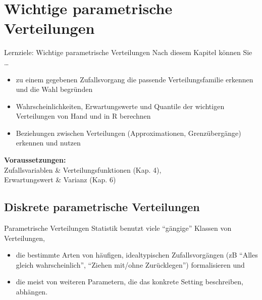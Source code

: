 \documentclass[
  10pt,
  ignorenonframetext,
]{beamer}
\providecommand{\tightlist}{%
  \setlength{\itemsep}{0pt}\setlength{\parskip}{0pt}}
\begin{document}
\hypertarget{wichtige-parametrische-verteilungen}{%
\section{Wichtige parametrische
Verteilungen}\label{wichtige-parametrische-verteilungen}}

\begin{frame}{Lernziele: Wichtige parametrische Verteilungen}
\protect\hypertarget{lernziele-wichtige-parametrische-verteilungen}{}
Nach diesem Kapitel können Sie \ldots{}

\begin{itemize}
\tightlist
\item
  zu einem gegebenen Zufallsvorgang die passende Verteilungsfamilie
  erkennen und die Wahl begründen
\item
  Wahrscheinlichkeiten, Erwartungswerte und Quantile der wichtigen
  Verteilungen von Hand und in R berechnen
\item
  Beziehungen zwischen Verteilungen (Approximationen, Grenzübergänge)
  erkennen und nutzen
\end{itemize}

\vspace{1em}

\textbf{Voraussetzungen:}\\
Zufallsvariablen \& Verteilungsfunktionen (Kap. 4),\\
Erwartungswert \& Varianz (Kap. 6)
\end{frame}

\hypertarget{diskrete-parametrische-verteilungen}{%
\subsection{Diskrete parametrische
Verteilungen}\label{diskrete-parametrische-verteilungen}}

\begin{frame}{Parametrische Verteilungen}
\protect\hypertarget{parametrische-verteilungen}{}
Statistik benutzt viele ``gängige'' Klassen von Verteilungen,

\begin{itemize}
\tightlist
\item
  die bestimmte Arten von häufigen, idealtypischen Zufallsvorgängen (zB
  ``Alles gleich wahrscheinlich'', ``Ziehen mit/ohne Zurücklegen'')
  formalisieren und
\item
  die meist von weiteren Parametern, die das konkrete Setting
  beschreiben, abhängen.
\end{itemize}
\end{frame}
\end{document}

